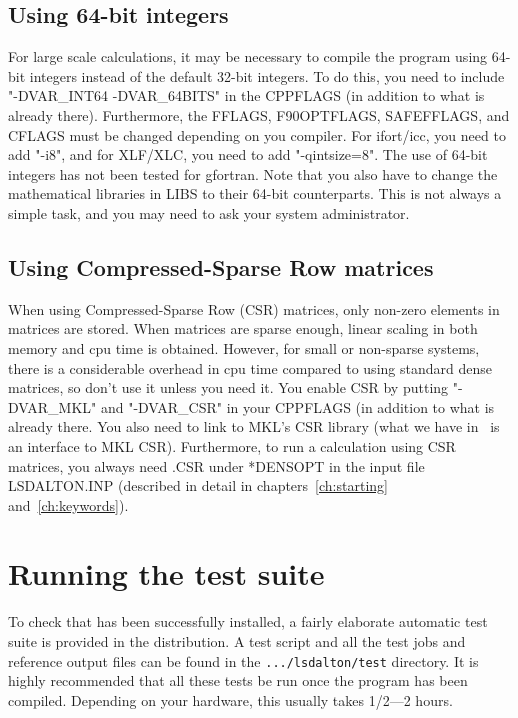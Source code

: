 \subsection{Using 64-bit integers}
For large scale calculations, it may be necessary to compile the program using 64-bit integers instead of the default 32-bit integers.
To do this, you need to include "-DVAR\_INT64 -DVAR\_64BITS" in the CPPFLAGS (in addition to what is already there). Furthermore, 
the FFLAGS, F90OPTFLAGS, SAFEFFLAGS, and CFLAGS must be changed depending on you compiler. For ifort/icc, you need to add "-i8",
and for XLF/XLC, you need to add "-qintsize=8". The use of 64-bit integers has not been tested for gfortran. Note that you also have
to change the mathematical libraries in LIBS to their 64-bit counterparts. This is not always a simple task, and you may need to ask your
system administrator. 

\subsection{Using Compressed-Sparse Row matrices}
When using Compressed-Sparse Row (CSR) matrices, only non-zero elements in matrices are stored. 
When matrices are sparse enough, linear scaling in both memory and cpu time is obtained. However, for
small or non-sparse systems, there is a considerable overhead in cpu time compared to 
using standard dense matrices, so don't use it unless you need it. You enable CSR by putting
"-DVAR\_MKL" and "-DVAR_CSR" in your CPPFLAGS (in addition to what is already there. You also need to link
to MKL's CSR library (what we have in \lsdalton\ is an interface to MKL CSR). Furthermore, to run a calculation
using CSR matrices, you always need .CSR under *DENSOPT in the input file LSDALTON.INP (described in detail in
chapters~\ref{ch:starting} and~\ref{ch:keywords}).

\section{Running the {\lsdalton} test suite}\label{sec:testsuite}

To check that {\lsdalton} has been successfully installed, a fairly
elaborate automatic test suite is provided in the distribution. A test
script and all the test jobs and reference output files can be found in
the \verb|.../lsdalton/test| directory. It is highly recommended that all
these tests be run once the program has been compiled. Depending on
your hardware, this usually takes 1/2---2 hours.

